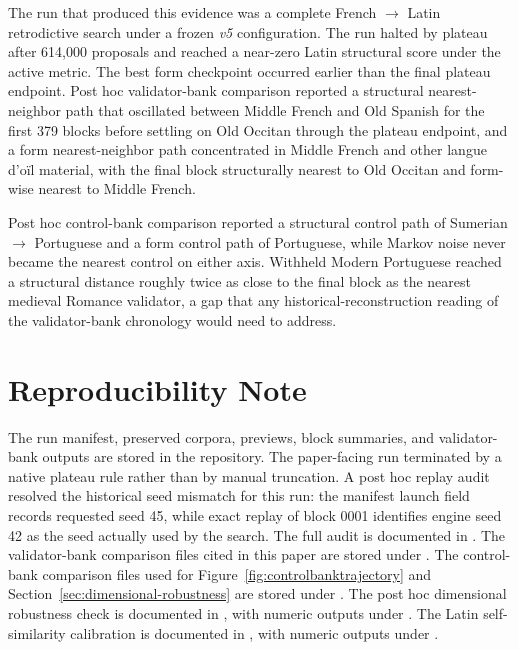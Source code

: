 \documentclass[11pt]{article}
\begin{document}
The run that produced this evidence was a complete French $\rightarrow$ Latin
retrodictive search under a frozen \emph{v5} configuration. The run halted by
plateau after 614{,}000 proposals and reached a near-zero Latin structural
score under the active metric. The best form checkpoint occurred earlier than
the final plateau endpoint. Post hoc validator-bank comparison reported a
structural nearest-neighbor path that oscillated between Middle French and
Old Spanish for the first 379 blocks before settling on Old Occitan through
the plateau endpoint, and a form nearest-neighbor path concentrated in Middle
French and other langue d'o\"il material, with the final block structurally
nearest to Old Occitan and form-wise nearest to Middle French.

Post hoc control-bank comparison reported a structural control path of
Sumerian $\rightarrow$ Portuguese and a form control path of Portuguese, while
Markov noise never became the nearest control on either axis. Withheld Modern
Portuguese reached a structural distance roughly twice as close to the final
block as the nearest medieval Romance validator, a gap that any
historical-reconstruction reading of the validator-bank chronology would need
to address.

\section*{Reproducibility Note}

The run manifest, preserved corpora, previews, block summaries, and
validator-bank outputs are stored in the repository. The paper-facing run
terminated by a native plateau rule rather than by manual truncation. A
post hoc replay audit resolved the historical seed mismatch for this run:
the manifest launch field records requested seed 45, while exact replay of
block 0001 identifies engine seed 42 as the seed actually used by the
search. The full audit is documented in
.
The validator-bank comparison files cited in this paper are stored under
.
The control-bank comparison files used for Figure~\ref{fig:controlbanktrajectory}
and Section~\ref{sec:dimensional-robustness} are stored under
.
The post hoc dimensional robustness check is documented in
,
with numeric outputs under
.
The Latin self-similarity calibration is documented in
,
with numeric outputs under
.
\end{document}
